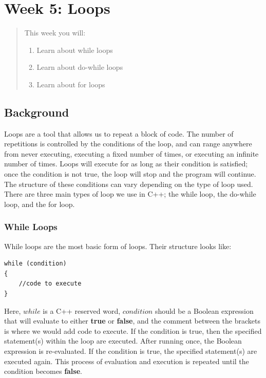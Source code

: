 \chapter*{Week 5: Loops}
\setcounter{chapter}{5}
\setcounter{section}{0}

\begin{abstract}
This week you will:
\begin{enumerate}
    \item Learn about while loops
    \item Learn about do-while loops
    \item Learn about for loops

\end{enumerate}
    
\end{abstract}

\section{Background}
Loops are a tool that allows us to repeat a block of code. The number of repetitions is controlled by the conditions of the loop, and can range anywhere from never executing, executing a fixed number of times, or executing an infinite number of times. Loops will execute for as long as their condition is satisfied; once the condition is not true, the loop will stop and the program will continue. The structure of these conditions can vary depending on the type of loop used. There are three main types of loop we use in C++; the while loop, the do-while loop, and the for loop.

\subsection{While Loops}
While loops are the most basic form of loops. Their structure looks like:

\begin{verbatim}
while (condition)
{
    //code to execute
}
\end{verbatim}

Here, $while$ is a C++ reserved word, $condition$ should be a Boolean expression that will evaluate to either \textbf{true} or \textbf{false}, and the comment between the brackets is where we would add code to execute. If the condition is true, then the specified statement(s) within the loop are executed. After running once, the Boolean expression is re-evaluated. If the condition is true, the specified statement(s) are executed again. This process of evaluation and execution is repeated until the condition becomes \textbf{false}.

